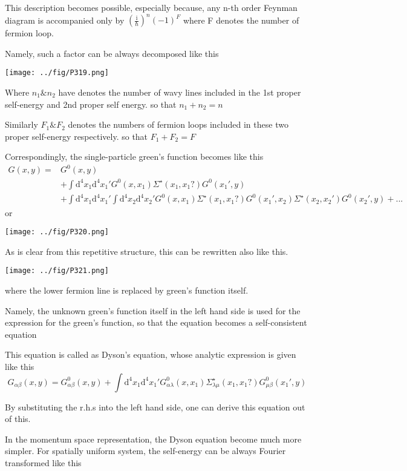 This description becomes possible, especially  because, any n-th order Feynman diagram is accompanied only by $(\frac{\mathrm{i}}{\hbar})^n(-1)^F$ where F denotes the number of fermion loop.

Namely, such a factor can be always decomposed like this
\begin{center}
\texttt{[image: ../fig/P319.png]}
\end{center}
Where $n_1\&n_2$ have denotes the number of wavy lines included in the 1st proper self-energy and 2nd proper self energy. so that $n_1+n_2=n$

Similarly $F_1\&F_2$ denotes the numbers of fermion loops included in these two proper self-energy respectively. so that $F_1+F_2=F$

Correspondingly, the single-particle green's function becomes like this
\begin{align}
G(x,y)=&G^0(x,y) \nonumber \\
&+\int \mathrm{d}^4x_1\mathrm{d}^4x_1'G^0(x,x_1)\Sigma^{\star}(x_1,x_1?)G^0(x_1',y) \nonumber \\
&+\int \mathrm{d}^4x_1\mathrm{d}^4x_1'\int \mathrm{d}^4x_2\mathrm{d}^4x_2'G^0(x,x_1)\Sigma^{\star}(x_1,x_1?)G^0(x_1',x_2)\Sigma^{\star}(x_2,x_2')G^0(x_2',y)+... \nonumber
\end{align}
or
\begin{center}
\texttt{[image: ../fig/P320.png]}
\end{center}
As is clear from this repetitive structure, this can be rewritten also like this.
\begin{center}
\texttt{[image: ../fig/P321.png]}
\end{center}
where the lower fermion line is replaced by green's function itself.

Namely, the unknown green's function itself in the left hand side is used for the expression for the green's function, so that the equation becomes a self-consistent equation

This equation is called as Dyson's equation, whose analytic expression is given like this
$$G_{\alpha\beta}(x,y)=G_{\alpha\beta}^0(x,y)+\int \mathrm{d}^4x_1\mathrm{d}^4x_1'G^0_{\alpha\lambda}(x,x_1)\Sigma_{\lambda\mu}^{\star}(x_1,x_1?)G_{\mu\beta}^0(x_1',y)$$
 
By substituting the r.h.s into the left hand side, one can derive this equation out of this.


In the momentum space representation, the Dyson equation become much more simpler. For spatially uniform system, the self-energy can be always Fourier transformed like this

